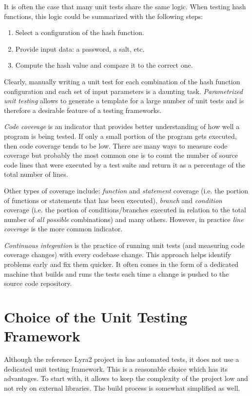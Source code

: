 It is often the case that many unit tests share the same logic. When testing hash functions, this logic could be summarized with the following steps:

\begin{enumerate}
    \item Select a configuration of the hash function.
    \item Provide input data: a password, a salt, etc.
    \item Compute the hash value and compare it to the correct one.
   \end{enumerate}

Clearly, manually writing a unit test for each combination of the hash function configuration and each set of input parameters is a daunting task. \emph{Parametrized unit testing} allows to generate a template for a large number of unit tests and is therefore a desirable feature of a testing frameworks.

\emph{Code coverage} is an indicator that provides better understanding of how well a program is being tested. If only a small portion of the program gets executed, then code coverage tends to be low. There are many ways to measure code coverage but probably the most common one is to count the number of source code lines that were executed by a test suite and return it as a percentage of the total number of lines.

Other types of coverage include: \emph{function} and \emph{statement} coverage (i.e. the portion of functions or statements that has been executed), \emph{branch} and \emph{condition} coverage (i.e. the portion of conditions/branches executed in relation to the total number of \emph{all possible} combinations) and many others. However, in practice \emph{line coverage} is the more common indicator.

\emph{Continuous integration} is the practice of running unit tests (and measuring code coverage changes) with every codebase change. This approach helps identify problems early and fix them quicker. It often comes in the form of a dedicated machine that builds and runs the tests each time a change is pushed to the source code repository.

\section{Choice of the Unit Testing Framework}

Although the reference Lyra2 project in \cite{github:2017:lyra} has automated tests, it does not use a dedicated unit testing framework. This is a reasonable choice which has its advantages. To start with, it allows to keep the complexity of the project low and not rely on external libraries. The build process is somewhat simplified as well.

